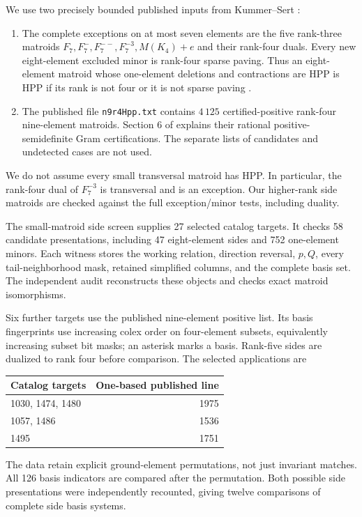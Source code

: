 \documentclass[11pt]{article}
\numberwithin{equation}{section}
\theoremstyle{definition}\newtheorem{definition}[theorem]{Definition}\newtheorem{remark}[theorem]{Remark}
\begin{document}
We use two precisely bounded published inputs from Kummer--Sert \cite{KS,KSdata}:
\begin{enumerate}[leftmargin=*,itemsep=3pt]
\item The complete exceptions on at most seven elements are the five rank-three matroids $F_7,F_7^{-},F_7^{--},F_7^{-3},M(K_4)+e$ and their rank-four duals. Every new eight-element excluded minor is rank-four sparse paving. Thus an eight-element matroid whose one-element deletions and contractions are HPP is HPP if its rank is not four or it is not sparse paving \cite[Section 5, Theorem 5.2]{KS}.
\item The published file \texttt{n9r4Hpp.txt} contains $4\,125$ certified-positive rank-four nine-element matroids. Section 6 of \cite{KS} explains their rational positive-semidefinite Gram certifications. The separate lists of candidates and undetected cases are not used.
\end{enumerate}
We do not assume every small transversal matroid has HPP. In particular, the rank-four dual of $F_7^{-3}$ is transversal and is an exception. Our higher-rank side matroids are checked against the full exception/minor tests, including duality.

The small-matroid side screen supplies 27 selected catalog targets. It checks 58 candidate presentations, including 47 eight-element sides and 752 one-element minors. Each witness stores the working relation, direction reversal, $p,Q$, every tail-neighborhood mask, retained simplified columns, and the complete basis set. The independent audit reconstructs these objects and checks exact matroid isomorphisms.

Six further targets use the published nine-element positive list. Its basis fingerprints use increasing colex order on four-element subsets, equivalently increasing subset bit masks; an asterisk marks a basis. Rank-five sides are dualized to rank four before comparison. The selected applications are
\begin{center}
\begin{tabular}{lr}
\toprule Catalog targets&One-based published line\\\midrule
1030, 1474, 1480&1975\\
1057, 1486&1536\\
1495&1751\\\bottomrule
\end{tabular}
\end{center}
The data retain explicit ground-element permutations, not just invariant matches. All 126 basis indicators are compared after the permutation. Both possible side presentations were independently recounted, giving twelve comparisons of complete side basis systems.
\end{document}
